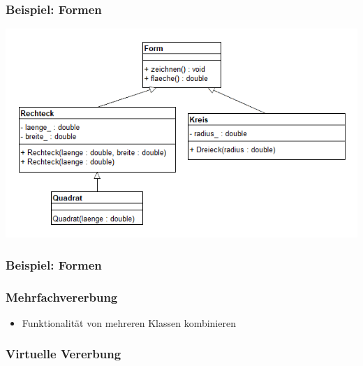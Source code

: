\documentclass{beamer}
\begin{document}
	{
	\begin{frame}[fragile]
		\frametitle{Beispiel: Formen}
		\includegraphics[width=\textwidth]{./res/polymorphie/universell/vererbung/form/uml.png}
	\end{frame}
	
	{
	\begin{frame}[fragile]
		\frametitle{Beispiel: Formen}
		\UseRawInputEncoding
		\pause{\tiny}
		\pause{\tiny}
		\pause{\tiny}
		\pause{\tiny}
		
	\end{frame}
	}
	
	\begin{frame}
		\frametitle{Mehrfachvererbung}
		\begin{itemize}
			\item Funktionalität von mehreren Klassen kombinieren
		\end{itemize}
	\end{frame}
	
	{
	\begin{frame}[fragile]
		\frametitle{Virtuelle Vererbung}
	\end{frame}
	
}}
\end{document}
